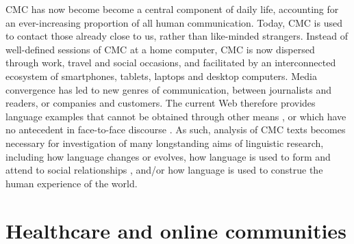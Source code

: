 
\gls{CMC} has now become become a central component of daily life, accounting for an ever\hyp{}increasing proportion of all human communication. Today, \gls{CMC} is used to contact those already close to us, rather than like\hyp{}minded strangers. Instead of well\hyp{}defined sessions of \gls{CMC} at a home computer, \gls{CMC} is now dispersed through work, travel and social occasions, and facilitated by an interconnected ecosystem of smartphones, tablets, laptops and desktop computers. Media convergence has led to new genres of communication, between journalists and readers, or companies and customers. The current Web therefore provides language examples that cannot be obtained through other means \cite{harvey_disclosures_2012}, or which have no antecedent in face\hyp{}to\hyp{}face discourse \cite{herring_discourse_2011}. As such, analysis of \gls{CMC} texts becomes necessary for investigation of many longstanding aims of linguistic research, including how language changes or evolves, how language is used to form and attend to social relationships \cite{canary_relationship_2015}, and\slash or how language is used to construe the human experience of the world.

\section{Healthcare and online communities}

